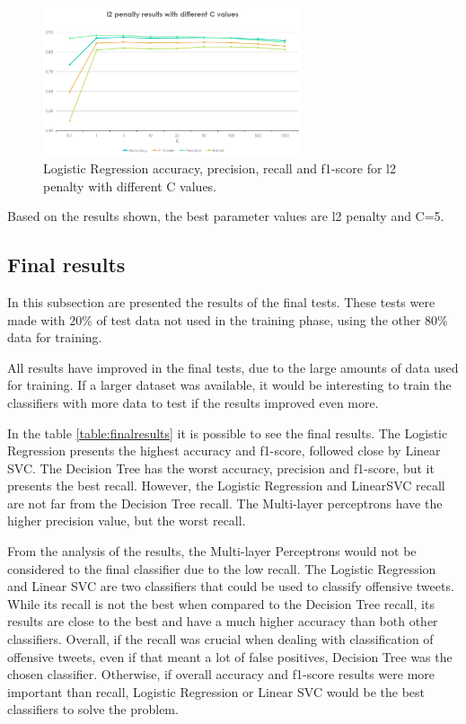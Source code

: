 \documentclass[journal]{IEEEtran}
\begin{document}
\begin{figure}[!t]
\centering
\includegraphics[width=3in]{lr2_w}
\caption{Logistic Regression accuracy, precision, recall and f1-score for l2 penalty with different C values.}
\label{lraprf}
\end{figure}

Based on the results shown, the best parameter values are l2 penalty and C=5.

\subsection{Final results}

In this subsection are presented the results of the final tests. These tests were made with 20\% of test data not used in the training phase, using the other 80\% data for training.

All results have improved in the final tests, due to the large amounts of data used for training. If a larger dataset was available, it would be interesting to train the classifiers with more data to test if the results improved even more.

In the table \ref{table:finalresults} it is possible to see the final results. The Logistic Regression presents the highest accuracy and f1-score, followed close by Linear SVC. The Decision Tree has the worst accuracy, precision and f1-score, but it presents the best recall. However, the Logistic Regression and LinearSVC recall are not far from the Decision Tree recall. The Multi-layer perceptrons have the higher precision value, but the worst recall.

From the analysis of the results, the Multi-layer Perceptrons would not be considered to the final classifier due to the low recall. The Logistic Regression and Linear SVC are two classifiers that could be used to classify offensive tweets. While its recall is not the best when compared to the Decision Tree recall, its results are close to the best and have a much higher accuracy than both other classifiers. Overall, if the recall was crucial when dealing with classification of offensive tweets, even if that meant a lot of false positives, Decision Tree was the chosen classifier. Otherwise, if overall accuracy and f1-score results were more important than recall, Logistic Regression or Linear SVC would be the best classifiers to solve the problem.
\end{document}
